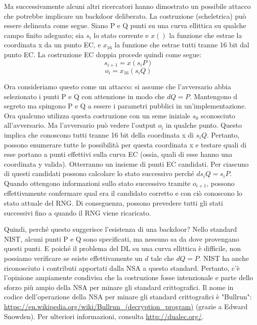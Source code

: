 \documentclass[11pt]{article}
\theoremstyle{definition} \newtheorem{definizione}{Definizione}[section] %
\begin{document}
        Ma successivamente alcuni altri ricercatori hanno dimostrato un possibile attacco che potrebbe implicare un backdoor deliberato. La costruzione (scheletrica) può essere delineata come segue. Siano P e Q punti su una curva ellittica su qualche campo finito adeguato; sia $s_i$ lo stato corrente e $x()$ la funzione che estrae la coordinata x da un punto EC, e $x_{16}$ la funzione che estrae tutti tranne 16 bit dal punto EC. La costruzione EC doppia procede quindi come segue:
        \[s_{i+1} = x(s_iP)\]
        \[o_i = x_{16}(s_iQ)\]

        Ora consideriamo questo come un attacco: si assume che l'avversario abbia selezionato i punti P e Q con attenzione in modo che \(dQ = P\). Mantengono d segreto ma spingono P e Q a essere i parametri pubblici in un'implementazione.
        Ora qualcuno utilizza questa costruzione con un seme iniziale \(s_0\) sconosciuto all'avversario.
        Ma l'avversario può vedere l'output \(o_i\) in qualche punto. Questo implica che conoscono tutti tranne 16 bit della coordinata x di \(s_iQ\). Pertanto, possono enumerare tutte le possibilità per questa coordinata x e testare quali di esse portano a punti effettivi sulla curva EC (ossia, quali di esse hanno una coordinata y valida). Otterranno un insieme di punti EC candidati. Per ciascuno di questi candidati possono calcolare lo stato successivo perché \(ds_iQ = s_iP\).
        Quando ottengono informazioni sullo stato successivo tramite \(o_{i+1}\), possono effettivamente confermare qual era il candidato corretto e con ciò conoscono lo stato attuale del RNG. Di conseguenza, possono prevedere tutti gli stati successivi fino a quando il RNG viene ricaricato.

        Quindi, perché questo suggerisce l'esistenza di una backdoor?
        Nello standard NIST, alcuni punti P e Q sono specificati, ma nessuno sa da dove provengano questi punti. E poiché il problema del DL su una curva ellittica è difficile, non possiamo verificare se esiste effettivamente un \(d\) tale che \(dQ = P\).
        NIST ha anche riconosciuto i contributi apportati dalla NSA a questo standard.
        Pertanto, c'è l'opinione ampiamente condivisa che la costruzione fosse intenzionale e parte dello sforzo più ampio della NSA per minare gli standard crittografici.
        Il nome in codice dell'operazione della NSA per minare gli standard crittografici è "Bullrun": \url{https://en.wikipedia.org/wiki/Bullrun_(decryption_program)} (grazie a Edward Snowden).
        Per ulteriori informazioni, consulta \url{http://dualec.org/}.
\end{document}
